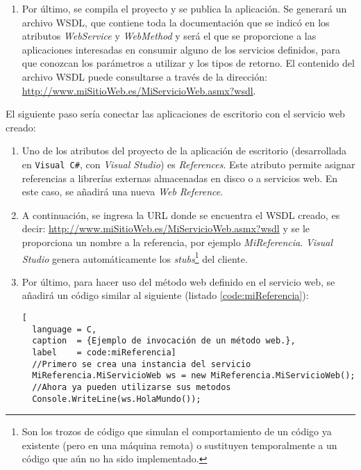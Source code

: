 \begin{enumerate}
\item Por último, se compila el proyecto y se publica la aplicación. Se
generará un archivo \acs{WSDL}, que contiene toda la documentación que se
indicó en los atributos \emph{WebService} y \emph{WebMethod} y será el que se 
proporcione a las aplicaciones interesadas en consumir alguno de los servicios
definidos, para que conozcan los parámetros a utilizar y los tipos de retorno.
El contenido del archivo \acs{WSDL} puede consultarse a través de la dirección:
\url{http://www.miSitioWeb.es/MiServicioWeb.asmx?wsdl}.
\end{enumerate}

El siguiente paso sería conectar las aplicaciones de escritorio con el
servicio web creado:
\begin{enumerate}
\item Uno de los atributos del proyecto de la aplicación de escritorio
(desarrollada en \texttt{Visual C\#}, con \emph{Visual Studio}) es
\emph{References}. Este atributo permite asignar referencias a librerías
externas almacenadas en disco o a servicios web. En este caso, se añadirá una
nueva \emph{Web Reference}.
\item A continuación, se ingresa la \acs{URL} donde se encuentra el \acs{WSDL}
creado, es decir: \url{http://www.miSitioWeb.es/MiServicioWeb.asmx?wsdl} y se
le proporciona un nombre a la referencia, por ejemplo \emph{MiReferencia}.
\emph{Visual Studio} genera automáticamente los \emph{stubs}\footnote{Son los
trozos de código que simulan el comportamiento de un código ya existente (pero
en una máquina remota) o sustituyen temporalmente a un código que aún no ha
sido implementado.} del cliente.
\item Por último, para hacer uso del método web definido en el servicio
web, se añadirá un código similar al siguiente (listado
\ref{code:miReferencia}):

\begin{lstlisting}[
  language = C,
  caption  = {Ejemplo de invocación de un método web.},
  label    = code:miReferencia]
  //Primero se crea una instancia del servicio
  MiReferencia.MiServicioWeb ws = new MiReferencia.MiServicioWeb();
  //Ahora ya pueden utilizarse sus metodos
  Console.WriteLine(ws.HolaMundo());
\end{lstlisting}

\end{enumerate}

